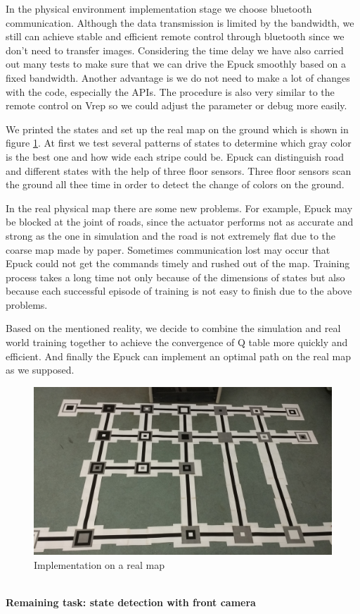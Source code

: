 \documentclass[a4paper, 11pt]{article} %
\begin{document}
In the physical environment implementation stage we choose bluetooth communication. Although the data transmission is limited by the bandwidth, we still can achieve stable and efficient remote control through bluetooth since we don't need to transfer images. Considering the time delay we have also carried out many tests to make sure that we can drive the Epuck smoothly based on a fixed bandwidth. Another advantage is we do not need to make a lot of changes with the code, especially the APIs. The procedure is also very similar to the remote control on Vrep so we could adjust the parameter or debug more easily.

We printed the states and set up the real map on the ground which is shown in figure \ref{fig3}. At first we test several patterns of states to determine which gray color is the best one and how wide each stripe could be. Epuck can distinguish road and different states with the help
of three floor sensors. Three floor sensors scan the ground all thee time in order to
detect the change of colors on the ground.

In the real physical map there are some new problems. For example, Epuck may be blocked at the joint of roads, since the actuator performs not as accurate and strong as the one in simulation and the road is not extremely flat due to the coarse map made by paper. Sometimes communication lost may occur that Epuck could not get the commands timely and rushed out of the map. Training process takes a long time not only because of the dimensions of states but also because each successful episode of training is not easy to finish due to the above problems.

Based on the mentioned reality, we decide to combine the simulation and real world training together to achieve the convergence of Q table more quickly and efficient. And finally the Epuck can implement an optimal path on the real map as we supposed.
\begin{figure}[tb]
\centering
\includegraphics[width=0.95\columnwidth]{RealMap}
\caption[An example of a floating figure]{Implementation on a real map} %
\label{fig3}
\end{figure}
\\[3ex]
\textbf{Remaining task: state detection with front camera}
\end{document}
